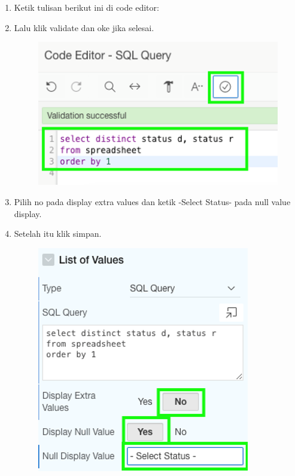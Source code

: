 \begin{enumerate}
\begin{figure}[!htbp]
    \label{penanda}
\end{figure}
    \item{Ketik tulisan berikut ini di code editor:}
    \item{Lalu klik validate dan oke jika selesai.}
\begin{figure}[!htbp]
    \centering
    \includegraphics[scale=0.5]{section/gambar_bab2/status3.png}
    \label{penanda}
\end{figure} 
    \item{Pilih no pada display extra values dan ketik -Select Status- pada null value display.}
    \item{Setelah itu klik simpan.}
    
\begin{figure}[!htbp]
    \centering
    \includegraphics[scale=0.5]{section/gambar_bab2/status4.png}
    \label{penanda}
\end{figure}
\end{enumerate}

